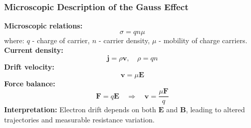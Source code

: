 \begin{frame}
	\frametitle{Microscopic Description of the Gauss Effect}
    \small
    \textbf{Microscopic relations:}
    \begin{equation}
        \sigma = q n \mu
    \end{equation}
    where:
    $q$ - charge of carrier, $n$ - carrier density, $\mu$ - mobility of charge carriers.\\
    \textbf{Current density:}
    \begin{equation}
        \mathbf{j} = \rho \mathbf{v}, \quad \rho = q n
    \end{equation}
    \textbf{Drift velocity:}
    \begin{equation}
        \mathbf{v} = \mu \mathbf{E}
    \end{equation}
    \textbf{Force balance:}
    \begin{equation}
        \mathbf{F} = q \mathbf{E} \quad \Rightarrow \quad \mathbf{v} = \frac{\mu \mathbf{F}}{q}
    \end{equation}
    \textbf{Interpretation:}
    Electron drift depends on both $\mathbf{E}$ and $\mathbf{B}$, leading to altered trajectories and measurable resistance variation.
\end{frame}


